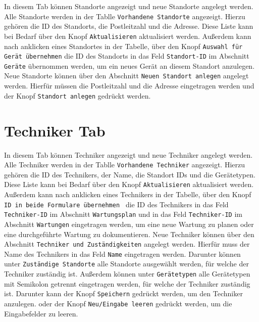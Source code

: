 \documentclass[11pt,a4paper]{article}
\begin{document}
In diesem Tab können Standorte angezeigt und neue Standorte angelegt werden.
Alle Standorte werden in der Tablle {\texttt{Vorhandene Standorte}} angezeigt. Hierzu gehören die ID des Standorts,
die Postleitzahl und die Adresse. Diese Liste kann bei Bedarf über den Knopf {\texttt{Aktualisieren}} aktualisiert werden. Außerdem kann nach
anklicken eines Standortes in der Tabelle, über den Knopf {\texttt{Auswahl für Gerät übernehmen}} die ID des Standorts in das Feld {\texttt{Standort-ID}} im Abschnitt {\texttt{Geräte}}
übernommen werden, um ein neues Gerät an diesem Standort anzulegen. Neue Standorte können über den Abschnitt {\texttt{Neuen Standort anlegen}} angelegt werden.
Hierfür müssen die Postleitzahl und die Adresse eingetragen werden und der Knopf {\texttt{Standort anlegen}} gedrückt werden.

\section{Techniker Tab}

In diesem Tab können Techniker angezeigt und neue Techniker angelegt werden.
Alle Techniker werden in der Tablle {\texttt{Vorhandene Techniker}} angezeigt. Hierzu gehören die ID des Technikers, der Name, die Standort IDs und die Gerätetypen.
Diese Liste kann bei Bedarf über den Knopf {\texttt{Aktualisieren}} aktualisiert werden. Außerdem kann nach anklicken eines Technikers in der Tabelle,
über den Knopf {\texttt{ID in beide Formulare übernehmen }} die ID des Technikers in das Feld {\texttt{Techniker-ID}} im Abschnitt {\texttt{Wartungsplan}} und 
in das Feld {\texttt{Techniker-ID}} im Abschnitt {\texttt{Wartungen}} eingetragen werden, um eine neue Wartung zu planen oder eine durchgeführte Wartung zu dokumentieren.
Neue Techniker können über den Abschnitt {\texttt{Techniker und Zuständigkeiten}} angelegt werden.
Hierfür muss der Name des Technikers in das Feld {\texttt{Name}} eingetragen werden. 
Darunter können unter {\texttt{Zuständige Standorte}} alle Standorte ausgewählt werden, für welche der Techniker zuständig ist.
Außerdem können unter {\texttt{Gerätetypen}} alle Gerätetypen mit Semikolon getrennt eingetragen werden, für welche der Techniker zuständig ist.
Darunter kann der Knopf {\texttt{Speichern}} gedrückt werden, um den Techniker anzulegen. oder der Knopf {\texttt{Neu/Eingabe leeren}} gedrückt werden,
um die Eingabefelder zu leeren.
\end{document}
